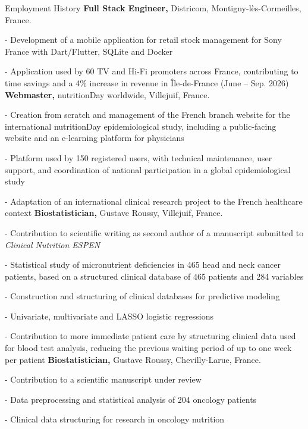 \begin{rubric}{Employment History}
%
\textbf{Full Stack Engineer, %
} Districom, Montigny-lès-Cormeilles, France.\par
- Development of a mobile application for retail stock management for Sony France with Dart/Flutter, SQLite and Docker\par
- Application used by 60 TV and Hi-Fi promoters across France, contributing to time savings and a 4\% increase in revenue in Île-de-France (June -- Sep. 2026)
%
\textbf{Webmaster, %
} nutritionDay worldwide, Villejuif, France.\par
- Creation from scratch and management of the French branch website for the international nutritionDay epidemiological study, including a public-facing website and an e-learning platform for physicians\par 
- Platform used by 150 registered users, with technical maintenance, user support, and coordination of national participation in a global epidemiological study\par
- Adaptation of an international clinical research project to the French healthcare context
%
\textbf{Biostatistician,%
} Gustave Roussy, Villejuif, France.\par
- Contribution to scientific writing as second author of a manuscript submitted to \textit{Clinical Nutrition ESPEN}\par
- Statistical study of micronutrient deficiencies in 465 head and neck cancer patients, based on a structured clinical database of 465 patients and 284 variables\par
- Construction and structuring of clinical databases for predictive modeling\par 
- Univariate, multivariate and LASSO logistic regressions\par
- Contribution to more immediate patient care by structuring clinical data used for blood test analysis, reducing the previous waiting period of up to one week per patient
%
\textbf{Biostatistician,%
} Gustave Roussy, Chevilly-Larue, France.\par
- Contribution to a scientific manuscript under review\par
- Data preprocessing and statistical analysis of 204 oncology patients\par
- Clinical data structuring for research in oncology nutrition\par

\end{rubric}
